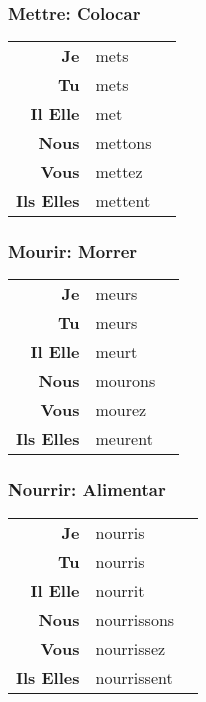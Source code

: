 \documentclass{subfiles}
\begin{document}
\begin{multicols}{3}
        \subsubsection{Mettre: Colocar}
            \begin{tabular}{r l r}
                \textbf{Je}        & mets    &\\
                \textbf{Tu}        & mets    &\\
                \textbf{Il Elle}   & met     &\\
                \textbf{Nous}      & mettons &\\
                \textbf{Vous}      & mettez  &\\
                \textbf{Ils Elles} & mettent &
            \end{tabular}

        \subsubsection{Mourir: Morrer}
            \begin{tabular}{r l r}
                \textbf{Je}        & meurs   &\\
                \textbf{Tu}        & meurs   &\\
                \textbf{Il Elle}   & meurt   &\\
                \textbf{Nous}      & mourons &\\
                \textbf{Vous}      & mourez  &\\
                \textbf{Ils Elles} & meurent &
            \end{tabular}

        \subsubsection{Nourrir: Alimentar}
            \begin{tabular}{r l r}
                \textbf{Je}        & nourris     &\\
                \textbf{Tu}        & nourris     &\\
                \textbf{Il Elle}   & nourrit     &\\
                \textbf{Nous}      & nourrissons &\\
                \textbf{Vous}      & nourrissez  &\\
                \textbf{Ils Elles} & nourrissent &
            \end{tabular}


\end{multicols}
\end{document}

